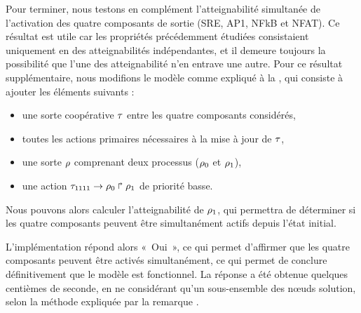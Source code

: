\myskip

Pour terminer, nous testons en complément l'atteignabilité simultanée
de l'activation des quatre composants de sortie (SRE, AP1, NFkB et NFAT).
Ce résultat est utile car les propriétés précédemment étudiées consistaient uniquement
en des atteignabilités indépendantes, et il demeure toujours la possibilité
que l'une des atteignabilité n'en entrave une autre.
Pour ce résultat supplémentaire, nous modifions le modèle comme expliqué à la
, qui consiste à ajouter les éléments suivants :
\begin{itemize}
  \item une sorte coopérative $\tau$ entre les quatre composants considérés,
  \item toutes les actions primaires nécessaires à la mise à jour de $\tau$,
  \item une sorte $\rho$ comprenant deux processus ($\rho_0$ et $\rho_1$),
  \item une action $\tau_{1111}\rightarrow\rho_0\Rsh\rho_1$ de priorité basse.
\end{itemize}
Nous pouvons alors calculer l'atteignabilité de $\rho_1$, qui permettra de déterminer
si les quatre composants peuvent être simultanément actifs depuis l'état initial.

L'implémentation répond alors «~Oui~», ce qui permet d'affirmer que les quatre composants
peuvent être activés simultanément,
ce qui permet de conclure définitivement que le modèle est fonctionnel.
La réponse a été obtenue quelques centièmes de seconde,
en ne considérant qu'un sous-ensemble des nœuds solution,
selon la méthode expliquée par la remarque .


